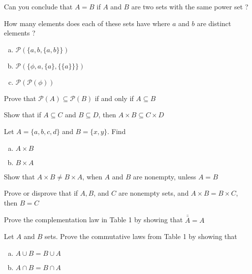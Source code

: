 \documentclass{article}
\newenvironment{problem}[2][Problem]{\begin{trivlist}
\item[\hskip \labelsep {\bfseries #1}\hskip \labelsep {\bfseries #2.}]}{\end{trivlist}}
\begin{document}
\begin{problem}{3}[Chapter 2.1, Question 24]
Can you conclude that $A = B$ if $A$ and $B$ are two sets with the same power set ?
\end{problem}
\begin{problem}{4}[Chapter 2.1, Question 25]
How many elements does each of these sets have where $a$ and $b$ are distinct elements ?
\begin{enumerate}[(a)]
    \item $ \mathcal{P}(\{a,b,\{a,b\}\})$
    \item $ \mathcal{P}(\{\phi,a,\{a\}, \{\{a\} \}\})$
    \item $ \mathcal{P}(\mathcal{P}(\phi))$
\end{enumerate}
\end{problem}
\begin{problem}{5}[Chapter 2.1, Question 27]
Prove that $ \mathcal{P}(A) \subseteq \mathcal {P}(B)$ if and only if $ A \subseteq B$
\end{problem}
\begin{problem}{6}[Chapter 2.1, Question 28]
Show that if $A \subseteq C$ and $ B \subseteq D$, then $ A \times B \subseteq C \times D$
\end{problem}
\begin{problem}{7}[Chapter 2.1, Question 29]
Let $A = \{a,b,c,d\}$ and $B = \{x,y\}$. Find
\begin{enumerate}[(a)]
    \item $ A \times B$
    \item $ B \times A$
\end{enumerate}
\end{problem}
\begin{problem}{8}[Chapter 2.1, Question 40]
Show that $ A \times B \neq B \times A$, when $A$ and $B$ are nonempty, unless $ A = B$
\end{problem}
\begin{problem}{9}[Chapter 2.1, Question 44]
Prove or disprove that if $A,B$, and $C$ are nonempty sets, and $A \times B = B \times C$, then $B=C$
\end{problem}
\begin{problem}{10}[Chapter 2.2, Question 5]
Prove the complementation law in Table 1 by showing that $ \bar{\bar{A}} = A$
\end{problem}
\begin{problem}{11}[Chapter 2.2, Question 11]
Let $A$ and $B$ sets. Prove the commutative laws from Table 1 by showing that
\begin{enumerate}[(a)]
    \item $A \cup B = B \cup A$
    \item $A \cap B = B \cap A$
\end{enumerate}
\end{problem}
\end{document}
